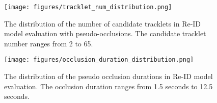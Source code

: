 \documentclass{article} \usepackage{iclr2023_conference,times}
\begin{document}
\begin{figure}[htb]
   \begin{minipage}{0.48\textwidth}
     \centering
     \texttt{[image: figures/tracklet\_num\_distribution.png]}
    \caption{The distribution of the number of candidate tracklets in Re-ID model evaluation with pseudo-occlusions. The candidate tracklet number ranges from 2 to 65.}
    \label{fig: track_num_distribution}
   \end{minipage}\hfill
   \begin{minipage}{0.48\textwidth}
    \centering
    \texttt{[image: figures/occlusion\_duration\_distribution.png]}
    \caption{The distribution of the pseudo occlusion durations in Re-ID model evaluation. The occlusion duration ranges from 1.5 seconds to 12.5 seconds.}
    \label{fig: psd_occ_length_distribution}
   \end{minipage}
\end{figure}
\end{document}
